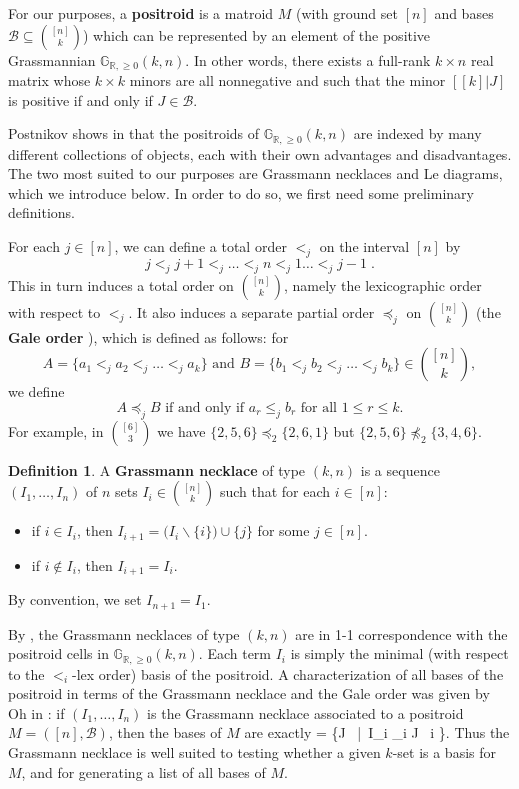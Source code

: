 \documentclass[11pt]{article}
\newcommand{\R}{\mathbb{R}}
\newcommand{\Gr}{\mathbb{G}_{\R, \geq 0}}
\def\ba #1\ea{\begin{align} #1 \end{align}}
\newcommand{\cB}{\mathcal{B}}
\newcommand{\gale}[1]{\preccurlyeq_{#1}}
\theoremstyle{remark}
\theoremstyle{definition}
\newtheorem{dfn}[thm]{Definition}
\begin{document}
For our purposes, a {\bf positroid} is a matroid $M$ (with ground set $[n]$ and bases $\cB \subseteq \binom{[n]}{k}$) which can be represented by an element of the positive Grassmannian $\Gr(k,n)$. In other words, there exists a full-rank $k\times n$ real matrix whose $k\times k$ minors are all nonnegative and such that the minor $[[k]|J]$ is positive if and only if $J \in \cB$.

Postnikov shows in \cite{Postnikov} that the positroids of $\Gr(k,n)$ are indexed by many different collections of objects, each with their own advantages and disadvantages. The two most suited to our purposes are Grassmann necklaces and Le diagrams, which we introduce below. In order to do so, we first need some preliminary definitions.

For each $j \in [n]$, we can define a total order $<_j$ on the interval $[n]$ by
\[ j <_j j+1 <_j \dots <_j n <_j 1 \dots <_j j-1\;.\]
This in turn induces a total order on $\binom{[n]}{k}$, namely the lexicographic order with respect to $<_j$.  It also induces a separate partial order $\gale{j}$ on $\binom{[n]}{k}$ (the {\bf Gale order} \cite{Gale}), which is defined as follows: for 
\[A = \{a_1 <_j a_2 <_j \dots <_j a_k\} \text{ and } B = \{b_1 <_j b_2 <_j \dots <_j b_k\} \in \binom{[n]}{k},\] we define
\[A \gale{j} B \text{ if and only if } a_r \leq_j b_r \text{ for all }1 \leq r \leq k.\]
For example, in $\binom{[6]}{3}$ we have $\{2,5,6\}\gale{2} \{2,6,1\}$ but $\{2,5,6\}\not\gale{2}\{3,4,6\}$.


\begin{dfn}\label{def:grassmann necklace}
A {\bf Grassmann necklace} of type $(k,n)$ is a sequence $(I_1, \dots, I_n)$ of $n$ sets $I_i \in \binom{[n]}{k}$ such that for each $i \in [n]$:
\begin{itemize}
\item if $i \in I_i$, then $I_{i+1} = \big(I_i \backslash \{i\}\big) \cup \{j\}$ for some $j \in[n]$.
\item if $i \not\in I_i$, then $I_{i+1} = I_i$.
\end{itemize}
By convention, we set $I_{n+1} = I_1$.
\end{dfn}

By \cite[Theorem 17.1]{Postnikov}, the Grassmann necklaces of type $(k,n)$ are in 1-1 correspondence with the positroid cells in $\Gr(k,n)$. Each term $I_i$ is simply the minimal (with respect to the $<_i$-lex order) basis of the positroid. A characterization of all bases of the positroid in terms of the Grassmann necklace and the Gale order was given by Oh in \cite[Theorem 8]{Oh}: if $(I_1, \dots, I_n)$ is the Grassmann necklace associated to a positroid $M = ([n],\cB)$, then the bases of $M$ are exactly
\ba \cB = \left\{J \in {}\ |\ I_i \gale{i} J \ \forall i \in [n]\right\}. \label{basesofmatroids}\ea
Thus the Grassmann necklace is well suited to testing whether a given $k$-set is a basis for $M$, and for generating a list of all bases of $M$.
\end{document}
